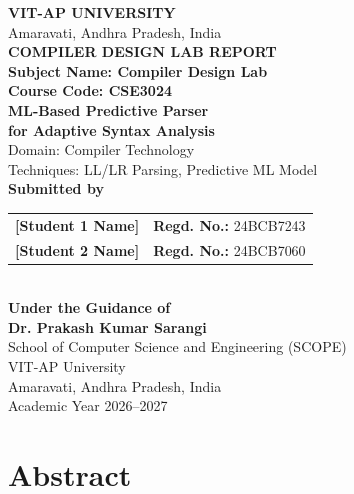 \documentclass[12pt,a4paper]{article}
\begin{document}
\begin{titlepage}
\begin{center}
\vspace*{0.5cm}
{\Large\bfseries VIT-AP UNIVERSITY}\\[0.3cm]
{\large Amaravati, Andhra Pradesh, India}\\[0.9cm]
{\Large\bfseries COMPILER DESIGN LAB REPORT}\\[0.4cm]
{\large\textbf{Subject Name: Compiler Design Lab}}\\[0.15cm]
{\large\textbf{Course Code: CSE3024}}\\[1.0cm]

{\LARGE\bfseries ML-Based Predictive Parser\\for Adaptive Syntax Analysis}\\[0.6cm]
{\large Domain: Compiler Technology\\ Techniques: LL/LR Parsing, Predictive ML Model}\\[1.1cm]

\textbf{Submitted by}\\[0.4cm]
\begin{tabular}{ll}
\textbf{[Student 1 Name]} & \textbf{Regd. No.:} 24BCB7243 \\[0.4cm]
\textbf{[Student 2 Name]} & \textbf{Regd. No.:} 24BCB7060 \\
\end{tabular}\\[1.1cm]

\textbf{Under the Guidance of}\\[0.3cm]
\textbf{Dr. Prakash Kumar Sarangi}\\[1.0cm]

{\large School of Computer Science and Engineering (SCOPE)\\
VIT-AP University\\
Amaravati, Andhra Pradesh, India}\\[0.4cm]
{\large Academic Year 2026--2027}
\end{center}
\end{titlepage}

\section*{Abstract}
\end{document}
